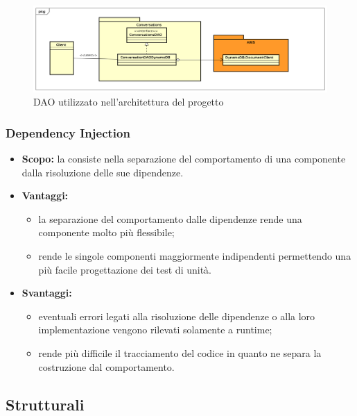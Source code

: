 \begin{figure}[h]
	\centering
	\includegraphics[width=\textwidth,height=\textheight,keepaspectratio,scale=0.1]{images/diagrams/back-end/DAO.png}
	\caption{DAO utilizzato nell'architettura del progetto \PROGETTO}\label{fig:dao2}
\end{figure}
		\newpage
    \subsubsection{Dependency Injection}
     \begin{itemize}
       \item \textbf{Scopo:} la consiste nella separazione del comportamento di una componente dalla risoluzione delle sue dipendenze.
	\item \textbf{Vantaggi:}
	  \begin{itemize}
	   \item la separazione del comportamento dalle dipendenze rende una componente molto più flessibile;
	   \item rende le singole componenti maggiormente indipendenti permettendo una più facile progettazione dei test di unità.
	  \end{itemize}
	\item \textbf{Svantaggi:}
	  \begin{itemize}
	   \item eventuali errori legati alla risoluzione delle dipendenze o alla loro implementazione vengono rilevati solamente a runtime;
	   \item rende più difficile il tracciamento del codice in quanto ne separa la costruzione dal comportamento.
	  \end{itemize}
	\end{itemize}

  \subsection{Strutturali}

